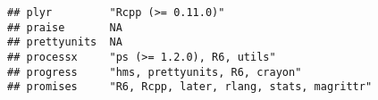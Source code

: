 \documentclass[]{book}
\begin{document}
\begin{verbatim}
## plyr         "Rcpp (>= 0.11.0)"                                                                                                                                                                                                                                                                                                                                                                                                                                                                                          
## praise       NA                                                                                                                                                                                                                                                                                                                                                                                                                                                                                                          
## prettyunits  NA                                                                                                                                                                                                                                                                                                                                                                                                                                                                                                          
## processx     "ps (>= 1.2.0), R6, utils"                                                                                                                                                                                                                                                                                                                                                                                                                                                                                  
## progress     "hms, prettyunits, R6, crayon"                                                                                                                                                                                                                                                                                                                                                                                                                                                                              
## promises     "R6, Rcpp, later, rlang, stats, magrittr"                                                                                                                                                                                                                                                                                                                                                                                                                                                                   

\end{verbatim}
\end{document}
